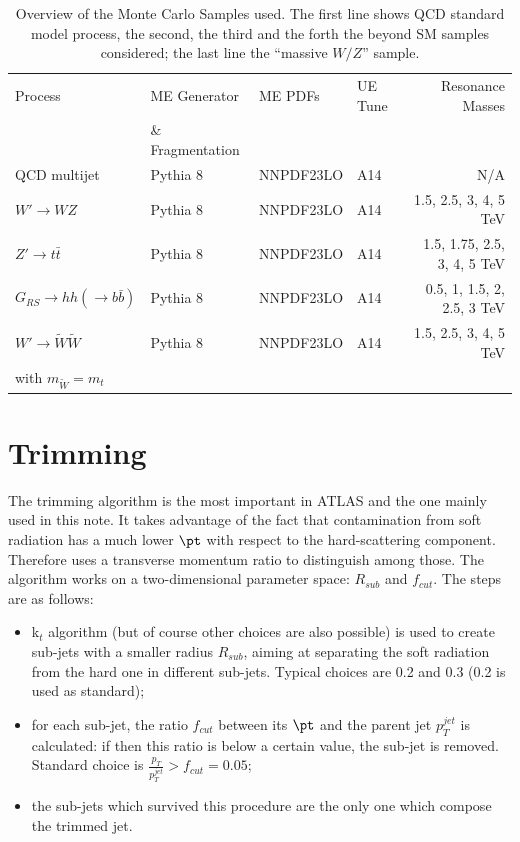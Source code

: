 \begin{table}
\centering
\hspace*{-3em}\begin{tabular}{l|lllr}  
\hline
\hline
Process & ME Generator & ME PDFs &  UE Tune & Resonance Masses\\
  & \& Fragmentation &  & & \\

\hline
QCD multijet &Pythia 8&NNPDF23LO & A14& N/A \\
\hline
$W'\to WZ$ &Pythia 8&NNPDF23LO & A14& 1.5, 2.5, 3, 4, 5 TeV \\
\cline{1-1}
$Z'\to t\bar{t}$ &Pythia 8&NNPDF23LO & A14& 1.5, 1.75, 2.5, 3, 4, 5 TeV \\
\cline{1-1}
$G_{RS} \to hh(\to b\bar{b})$ &Pythia 8&NNPDF23LO & A14& 0.5, 1, 1.5, 2, 2.5, 3 TeV\\
\cline{1-1}
$W' \to \tilde{W}\tilde{W}$ &Pythia 8&NNPDF23LO & A14& 1.5, 2.5, 3, 4, 5 TeV \\
with $m_{\tilde{W}}=m_t$ & & & & \\
\hline
\hline
\end{tabular}
\caption[Overview of the Monte Carlo Samples used]{Overview of the Monte Carlo Samples used. The first line shows QCD standard model process, the second, the third and the forth the beyond SM samples considered; the last line the ``massive $W/Z$'' sample.}
\label{tab:mcsamples}
\end{table}


\section{Trimming}

The trimming algorithm is the most important in ATLAS and the one mainly used in this note. It takes advantage of the fact that contamination from soft radiation has a much lower $\pt$ with respect to the hard-scattering component. Therefore uses a transverse momentum ratio to distinguish among those. The algorithm works on a two-dimensional parameter space: $R_{sub}$ and $f_{cut}$.
The steps are as follows:
\begin{itemize}
 \item k$_t$ algorithm (but of course other choices are also possible) is used to create sub-jets with a smaller radius $R_{sub}$, aiming at separating the soft radiation from the hard one in different sub-jets. Typical choices are 0.2 and 0.3 (0.2 is used as standard);
 \item for each sub-jet, the ratio $f_{cut}$ between its $\pt$ and the parent jet $p_T^{jet}$ is calculated: if then this ratio is below a certain value, the sub-jet is removed. Standard choice is $\frac{p_{T}}{p_{T}^{jet}} > f_{cut}=0.05$;
 \item the sub-jets which survived this procedure are the only one which compose the trimmed jet.
\end{itemize}

